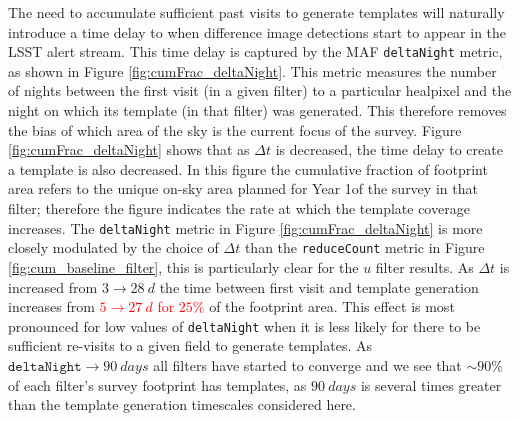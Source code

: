 \documentclass[preprint,linenumbers]{aastex631}
\providecommand{\red}[1]{\textcolor{red}{#1}}
\begin{document}
{		
		The need to accumulate sufficient past visits to generate templates will naturally introduce a time delay to when difference image detections start to appear in the LSST alert stream.
		This time delay is captured by the MAF \verb|deltaNight| metric, as shown in Figure \ref{fig:cumFrac_deltaNight}.
		This metric measures the number of nights between the first visit (in a given filter) to a particular healpixel and the night on which its template (in that filter) was generated.
		This therefore removes the bias of which area of the sky is the current focus of the survey. %
		Figure \ref{fig:cumFrac_deltaNight} shows that as $\Delta t$ is decreased, the time delay to create a template is also decreased.
		In this figure the cumulative fraction of footprint area refers to the unique on-sky area planned for Year 1of the survey in that filter; therefore the figure indicates the rate at which the template coverage increases.
		The \texttt{deltaNight} metric in Figure \ref{fig:cumFrac_deltaNight} is more closely modulated by the choice of $\Delta t$ than the \texttt{reduceCount} metric in Figure \ref{fig:cum_baseline_filter}, this is particularly clear for the $u$ filter results.
		As $\Delta t$ is increased from $3 \rightarrow 28\ \si{d}$ the time between first visit and template generation increases from \red{$5 \rightarrow 27\ \si{d}$ for $25\%$} of the footprint area.
		This effect is most pronounced for low values of \texttt{deltaNight} when it is less likely for there to be sufficient re-visits to a given field to generate templates. 
		As $\texttt{deltaNight}\rightarrow 90\ \si{days}$ all filters have started to converge and we see that $\sim 90\%$ of each filter's survey footprint has templates, as $90\ \si{days}$ is several times greater than the template generation timescales considered here. 
		\\
		
}
\end{document}
